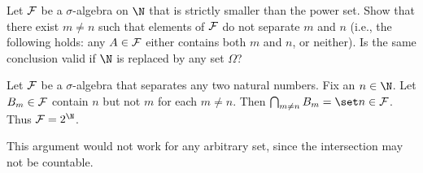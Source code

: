 \documentclass[12pt]{article}
\begin{document}
\begin{problem}
    Let $\mathcal F$ be a $\sigma$-algebra on $\N$ that is strictly smaller than
    the power set.
    Show that there exist $m \ne n$ such that elements of $\mathcal F$ do not
    separate $m$ and $n$ (i.e., the following holds: any $A \in \mathcal F$
    either contains both $m$ and $n$, or neither).
    Is the same conclusion valid if $\N$ is replaced by any set $\Omega$?
\end{problem}
\begin{solution}
    Let $\mathcal F$ be a $\sigma$-algebra that separates any two natural numbers.
    Fix an $n \in \N$.
    Let $B_m \in \mathcal F$ contain $n$ but not $m$ for each $m \ne n$.
    Then $\bigcap_{m \ne n} B_m = \set n \in \F$.
    Thus $\F = 2^\N$.

    This argument would not work for any arbitrary set,
    since the intersection may not be countable.
\end{solution}
\end{document}
